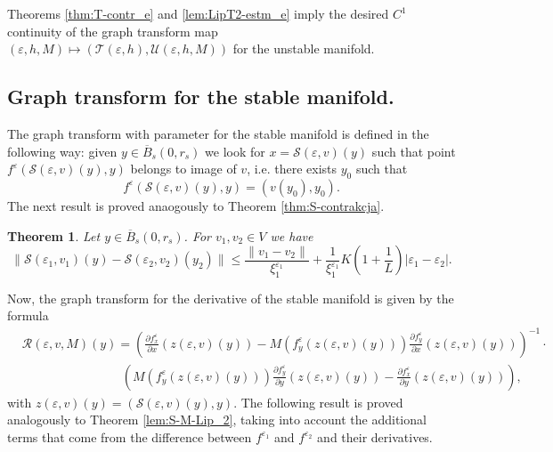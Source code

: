 \documentclass[11pt, leqno]{amsart}
\newtheorem{thm}{Theorem}[section]
\theoremstyle{definition}
\begin{document}
Theorems \ref{thm:T-contr_e} and \ref{lem:LipT2-estm_e} imply the desired $C^1$ continuity of the graph transform map \\
$(\varepsilon,h,M)\mapsto (\mathcal{T}(\varepsilon,h),\mathcal{U}(\varepsilon,h,M))
$ for the unstable manifold.

\subsection{Graph transform for the stable manifold.}
The graph transform with parameter for the stable manifold is defined in the following way:  given $y \in \overline{B}_s(0,r_s)$ we look for $x=\mathcal{S}(\varepsilon,v)(y)$ such that point $f^{\varepsilon}(\mathcal{S}(\varepsilon,v)(y),y)$ belongs to image of  $v$, i.e. there exists $y_0$ such that
\begin{equation}
	f^\varepsilon(\mathcal{S}(\varepsilon,v)(y),y)=(v(y_0),y_0).
\end{equation}
The next result is proved anaogously to Theorem \ref{thm:S-contrakcja}.
\begin{thm}
	\label{thm:S-contrakcja_e}
Let $y\in \overline{B}_s(0,r_s)$. For $v_1,v_2 \in V$ we have
	\begin{equation}
		\|\mathcal{S}(\varepsilon_1,v_1)(y) - \mathcal{S}(\varepsilon_2,v_2)(y_2)\| \leq \frac{\|v_1- v_2\|}{\xi_1^{\varepsilon_1}} + \frac{1}{\xi_1^{\varepsilon_1}}K\left(1+\frac{1}{L}\right)|\varepsilon_1-\varepsilon_2|.
	\end{equation}
\end{thm}
Now, the graph transform for the derivative of the stable manifold is given by the formula
\begin{align}
	&   \mathcal{R}(\varepsilon,v,M)(y)= \left(\frac{\partial f^{\varepsilon}_x}{\partial x}(z(\varepsilon,v)(y)) -  M(f^\varepsilon_y(z(\varepsilon,v)(y))) \frac{\partial f^{\varepsilon}_y}{\partial x}(z(\varepsilon,v)(y)) \right)^{-1} \cdot  \label{eq:S2-def_e} \\
	& \qquad \qquad \qquad \qquad   \left( M(f^\varepsilon_y(z(\varepsilon,v)(y)))\frac{\partial f^\varepsilon_y}{\partial y}(z(\varepsilon,v)(y)) -   \frac{\partial f^\varepsilon_x}{\partial y}(z(\varepsilon,v)(y)) \right), \nonumber
\end{align}
with $z(\varepsilon,v)(y)=(\mathcal{S}(\varepsilon,v)(y),y)$. The following result is proved analogously to Theorem \ref{lem:S-M-Lip_2}, taking into account the additional terms that come from the difference between $f^{\varepsilon_1}$ and $f^{\varepsilon_2}$ and their derivatives.
\end{document}
